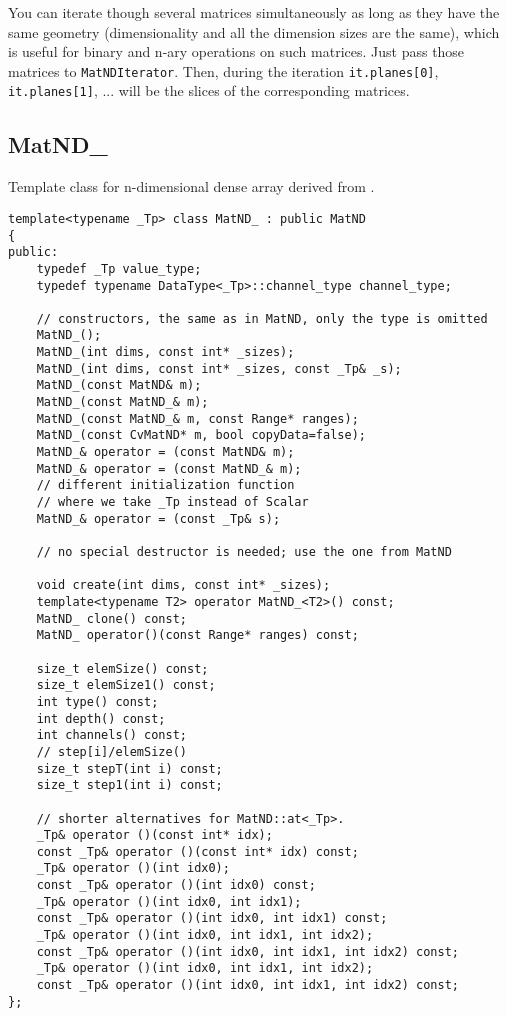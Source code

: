 You can iterate though several matrices simultaneously as long as they have the same geometry (dimensionality and all the dimension sizes are the same), which is useful for binary and n-ary operations on such matrices. Just pass those matrices to \texttt{MatNDIterator}. Then, during the iteration \texttt{it.planes[0]}, \texttt{it.planes[1]}, ... will be the slices of the corresponding matrices.

\subsection{MatND\_}
Template class for n-dimensional dense array derived from .

\begin{lstlisting}
template<typename _Tp> class MatND_ : public MatND
{
public:
    typedef _Tp value_type;
    typedef typename DataType<_Tp>::channel_type channel_type;

    // constructors, the same as in MatND, only the type is omitted
    MatND_();
    MatND_(int dims, const int* _sizes);
    MatND_(int dims, const int* _sizes, const _Tp& _s);
    MatND_(const MatND& m);
    MatND_(const MatND_& m);
    MatND_(const MatND_& m, const Range* ranges);
    MatND_(const CvMatND* m, bool copyData=false);
    MatND_& operator = (const MatND& m);
    MatND_& operator = (const MatND_& m);
    // different initialization function
    // where we take _Tp instead of Scalar
    MatND_& operator = (const _Tp& s);

    // no special destructor is needed; use the one from MatND

    void create(int dims, const int* _sizes);
    template<typename T2> operator MatND_<T2>() const;
    MatND_ clone() const;
    MatND_ operator()(const Range* ranges) const;

    size_t elemSize() const;
    size_t elemSize1() const;
    int type() const;
    int depth() const;
    int channels() const;
    // step[i]/elemSize()
    size_t stepT(int i) const;
    size_t step1(int i) const;

    // shorter alternatives for MatND::at<_Tp>.
    _Tp& operator ()(const int* idx);
    const _Tp& operator ()(const int* idx) const;
    _Tp& operator ()(int idx0);
    const _Tp& operator ()(int idx0) const;
    _Tp& operator ()(int idx0, int idx1);
    const _Tp& operator ()(int idx0, int idx1) const;
    _Tp& operator ()(int idx0, int idx1, int idx2);
    const _Tp& operator ()(int idx0, int idx1, int idx2) const;
    _Tp& operator ()(int idx0, int idx1, int idx2);
    const _Tp& operator ()(int idx0, int idx1, int idx2) const;
};
\end{lstlisting}

